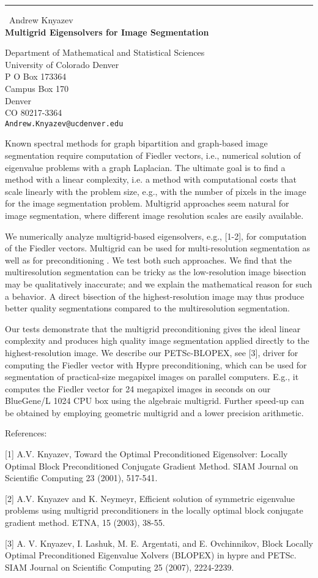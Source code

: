 \documentclass{report}
\begin{document}
\begin{center}
\rule{6in}{1pt} \
{\large Andrew Knyazev \\
{\bf Multigrid Eigensolvers for Image Segmentation}}

Department of Mathematical and Statistical Sciences \\ University of Colorado Denver \\ P O Box 173364 \\ Campus Box 170 \\ Denver \\ CO 80217-3364
\\
{\tt Andrew.Knyazev@ucdenver.edu}\end{center}

Known spectral methods for graph bipartition and graph-based image
segmentation require computation of Fiedler vectors, i.e., numerical
solution of eigenvalue problems with a graph Laplacian.
The ultimate goal is to find a method with a linear complexity, i.e. a
method with computational costs that scale linearly with the problem
size, e.g., with the number of pixels in the image for the image
segmentation problem. Multigrid approaches seem natural for image
segmentation, where different image resolution scales are easily
available.

We numerically analyze multigrid-based eigensolvers, e.g., [1-2], for
computation of the Fiedler vectors. Multigrid can be used for
multi-resolution segmentation as well as for preconditioning . We test
both such approaches. We find that the multiresolution segmentation can
be tricky as the low-resolution image bisection may be qualitatively
inaccurate; and we explain the mathematical reason for such a behavior. A
direct bisection of the highest-resolution image may thus produce better
quality segmentations compared to the multiresolution segmentation.

Our tests demonstrate that the multigrid preconditioning gives the ideal
linear complexity and produces high quality image segmentation applied
directly to the highest-resolution image. We describe our PETSc-BLOPEX,
see [3], driver for computing the Fiedler vector with Hypre
preconditioning, which can be used for segmentation of practical-size
megapixel images on parallel computers. E.g., it computes the Fiedler
vector for 24 megapixel images in seconds on our BlueGene/L 1024 CPU box
using the algebraic multigrid. Further speed-up can be obtained by
employing geometric multigrid and a lower precision arithmetic.

References:

[1] A.V. Knyazev, Toward the Optimal Preconditioned Eigensolver: Locally
Optimal Block Preconditioned Conjugate Gradient Method. SIAM Journal on
Scientific Computing 23 (2001), 517-541.

[2] A.V. Knyazev and K. Neymeyr, Efficient solution of symmetric
eigenvalue problems using multigrid preconditioners in the locally
optimal block conjugate gradient method. ETNA, 15 (2003), 38-55.

[3] A. V. Knyazev, I. Lashuk, M. E. Argentati, and E. Ovchinnikov, Block
Locally Optimal Preconditioned Eigenvalue Xolvers (BLOPEX) in hypre and
PETSc. SIAM Journal on Scientific Computing 25 (2007), 2224-2239.
\end{document}
